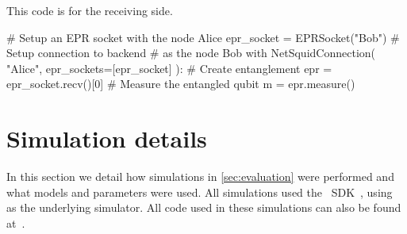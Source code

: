 This code is for the receiving side.
\begin{pycode}
# Setup an EPR socket with the node Alice
epr_socket = EPRSocket("Bob")
# Setup connection to backend
# as the node Bob
with NetSquidConnection(
"Alice",
epr_sockets=[epr_socket]
):
  # Create entanglement
  epr = epr_socket.recv()[0]
  # Measure the entangled qubit
  m = epr.measure()
\end{pycode}

\section{Simulation details}\label{app:simulation}

In this section we detail how simulations in \cref{sec:evaluation} were
performed and what models and parameters were used. All simulations used the
\netqasm\ SDK~\cite{git_netqasm}, using
\netsquid~\cite{netsquid,coopmans2021netsquid} as the underlying simulator. All
code used in these simulations can also be found at~\cite{git_squidasm}.


